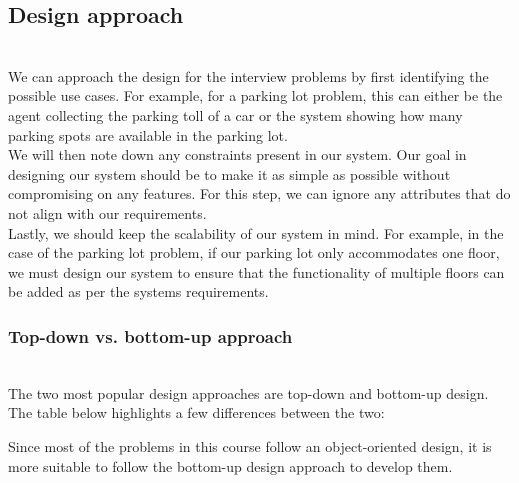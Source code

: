 \subsection{Design approach}\label{DBcyZMSVJBixhxqN4KAql-3}
\\
We can approach the design for the interview problems by first identifying the possible use cases. For example, for a parking lot problem, this can either be the agent collecting the parking toll of a car or the system showing how many parking spots are available in the parking lot.
\\
We will then note down any constraints present in our system. Our goal in designing our system should be to make it as simple as possible without compromising on any features. For this step, we can ignore any attributes that do not align with our requirements.
\\
Lastly, we should keep the scalability of our system in mind. For example, in the case of the parking lot problem, if our parking lot only accommodates one floor, we must design our system to ensure that the functionality of multiple floors can be added as per the system\textquotesingle s requirements.

\subsubsection{Top-down vs. bottom-up approach}\label{oOfY84Pnf_-leW2m9Ozzs}
\\
The two most popular design approaches are top-down and bottom-up design. The table below highlights a few differences between the two:

\begin{table}[htbp]
\centering
\small
{}
\end{table}

Since most of the problems in this course follow an object-oriented design, it is more suitable to follow the bottom-up design approach to develop them.

